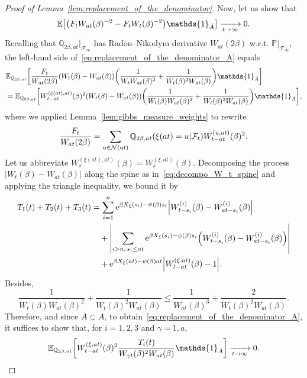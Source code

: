 \documentclass[10pt]{amsart}
\theoremstyle{definition}\newtheorem{defi}[theo]{Definition}\newtheorem{rema}[theo]{Remark}\newtheorem{exam}[theo]{Example}\newtheorem{exem}[theo]{Example}\newtheorem{nota}[theo]{Notation}
\newcommand{\e}{\mathrm{e}}
\newcommand{\E}{\mathbb{E}}
\renewcommand{\P}{\mathbb{P}}
\newcommand{\Q}{\mathbb{Q}}
\newcommand\1{\mathds{1}}
\newcommand{\cF}{\mathcal{F}}
\newcommand{\cN}{\mathcal{N}}
\let\originalleft\left
\let\originalright\right
\renewcommand{\left}{\mathopen{}\mathclose\bgroup\originalleft}
\renewcommand{\right}{\aftergroup\egroup\originalright}
\renewcommand*{\to}{\mathchoice{\longrightarrow}{\rightarrow}{\rightarrow}{\rightarrow}}
\begin{document}
\begin{proof}[Proof of Lemma~\ref{lem:replacement_of_the_denominator}]
Now, let us show that
\begin{equation}\label{eq:replacement_of_the_denominator_A}
\E\left[\left(F_t W_{at}(\beta)^{-2} - F_t W_t(\beta)^{-2}\right) \1_{\bar{A}}\right] \xrightarrow[t \to \infty]{} 0.
\end{equation}
Recalling that $\Q_{2\beta, at}|_{\cF_\infty}$ has Radon--Nikodym derivative $W_{at}(2\beta)$ w.r.t. $\P|_{\cF_\infty}$, the left-hand side of~\eqref{eq:replacement_of_the_denominator_A} equals
\begin{align*}
&\E_{\Q_{2\beta, at}} \left[\frac{F_t}{W_{at}(2\beta)} (W_t(\beta) - W_{at}(\beta)) \left(\frac{1}{W_t W_{at}(\beta)^2} + \frac{1}{W_t(\beta)^2 W_{at}(\beta)} \right) \1_{\bar{A}} \right]  \\
&= \E_{\Q_{2\beta, at}} \left[W_{t - at}^{(\xi(at), at)}(\beta)^2 (W_t(\beta) - W_{at}(\beta)) \left(\frac{1}{W_t(\beta) W_{at}(\beta)^2} + \frac{1}{W_t(\beta)^2 W_{at}(\beta)} \right) \1_{\bar{A}} \right],
\end{align*}
where we applied Lemma~\ref{lem:gibbs_measure_weights} to rewrite
\begin{equation*}
\frac{F_t}{W_{at}(2\beta)} = \sum_{u \in \cN(at)} \Q_{2\beta, at} \left(\xi(at) = u \middle| \cF_t \right) W_{t - at}^{(u, at)}(\beta)^2.
\end{equation*}
Let us abbreviate $W_s^{(\xi(at), at)}(\beta) = W_s^{(\xi, at)}(\beta)$. Decomposing the process $|W_t(\beta) - W_{at}(\beta)|$ along the spine as in~\eqref{eq:decompo_W_t_spine} and applying the triangle inequality, we bound it by
\begin{align*}
T_1(t) + T_2(t) + T_3(t)  &= \sum_{i = 1}^n \e^{\beta X_\xi(s_i) - \psi(\beta)s_i} \left|W_{t - s_i}^{(i)}(\beta) - W_{at - s_i}^{(i)}(\beta)\right|  \\
&\quad+ \left| \sum_{i > n,\, s_i \leq at} \e^{\beta X_\xi(s_i) - \psi(\beta)s_i} \left(W_{t - s_i}^{(i)}(\beta) - W_{at - s_i}^{(i)}(\beta)\right) \right| \\
&\quad+ \e^{\beta X_\xi(at) - \psi(\beta)at} \left|W_{t - at}^{(\xi, at)}(\beta) - 1\right|.
\end{align*}
Besides,
\begin{equation*}
\frac{1}{W_t(\beta) W_{at}(\beta)^2} + \frac{1}{W_t(\beta)^2 W_{at}(\beta)} \leq \frac{1}{W_{at}(\beta)^3} + \frac{2}{W_t(\beta)^2 W_{at}(\beta)}.
\end{equation*}
Therefore, and since $\bar{A} \subset A$, to obtain~\eqref{eq:replacement_of_the_denominator_A}, it suffices to show that, for $i = 1,2,3$ and $\gamma = 1, a$,
\begin{equation}\label{eq:replacement_of_the_denominator_A_reformulation}
\E_{\Q_{2\beta, at}} \left[W_{t - at}^{(\xi, at)}(\beta)^2 \frac{T_i(t)}{W_{\gamma t}(\beta)^2 W_{at}(\beta)} \1_A \right] \xrightarrow[t \to \infty]{} 0.
\end{equation}


\end{proof}
\end{document}
